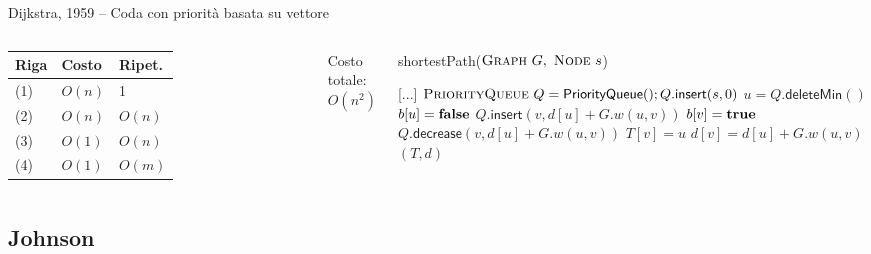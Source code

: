 \begin{frame}{Dijkstra, 1959 -- Coda con priorità basata su vettore}



\vspace{-9pt}
\begin{columns}

\begin{tabular}{|l|l|l|}
\hline
Riga & Costo & Ripet. \\\hline
(1) & $O(n)$ & 1 \\\hline
(2) & $O(n)$ & $O(n)$ \\\hline
(3) & $O(1)$ & $O(n)$ \\\hline
(4) & $O(1)$ & $O(m)$ \\\hline
\end{tabular}

\medskip
Costo totale: \alert{$O(n^2)$}

\vspace{-12pt}
\tiny
\begin{Procedure}
\caption[A]{\textsf{shortestPath}($\textsc{Graph}\ G,\ \textsc{Node}\ s$)}
[...]\;
\alert{$\textsc{PriorityQueue}\ Q = \textsf{PriorityQueue}(); Q.\textsf{insert}(s, 0)$}\;
{
  \alert{$u = Q.\textsf{deleteMin}()$}\;
  $b[u] = \FALSE$\;
  {
    {
      {
        \alert{$Q.\textsf{insert}(v, d[u]+G.w(u,v))$}\;
        $b[v] = \TRUE$\;
      }
      {
        \alert{$Q.\textsf{decrease}(v, d[u]+G.w(u,v))$}
      }
      $T[v] = u$\;
      $d[v] = d[u] + G.w(u,v)$\;
    }
  }
}
\Return $(T,d)$
\end{Procedure}
\end{columns}



\end{frame}

\subsection{Johnson}

